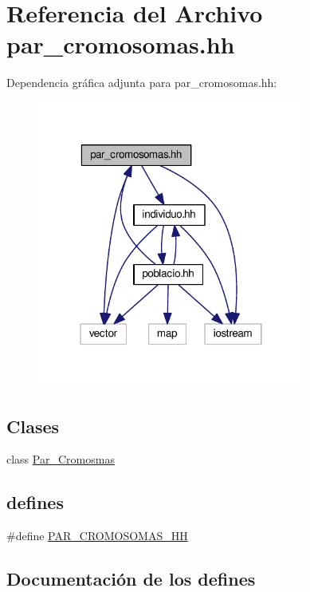 \hypertarget{par__cromosomas_8hh}{}\section{Referencia del Archivo par\+\_\+cromosomas.\+hh}
\label{par__cromosomas_8hh}
Dependencia gráfica adjunta para par\+\_\+cromosomas.\+hh\+:
\nopagebreak
\begin{figure}[H]
\begin{center}
\leavevmode
\includegraphics[width=250pt]{par__cromosomas_8hh__incl}
\end{center}
\end{figure}
\subsection*{Clases}
\begin{DoxyCompactItemize}
\item 
class \hyperlink{class_par___cromosmas}{Par\+\_\+\+Cromosmas}
\end{DoxyCompactItemize}
\subsection*{\textquotesingle{}defines\textquotesingle{}}
\begin{DoxyCompactItemize}
\item 
\#define \hyperlink{par__cromosomas_8hh_a76f8c8fb616d504ef7e9ff7b6d22af93}{P\+A\+R\+\_\+\+C\+R\+O\+M\+O\+S\+O\+M\+A\+S\+\_\+\+H\+H}
\end{DoxyCompactItemize}


\subsection{Documentación de los \textquotesingle{}defines\textquotesingle{}}
\hypertarget{par__cromosomas_8hh_a76f8c8fb616d504ef7e9ff7b6d22af93}{}
